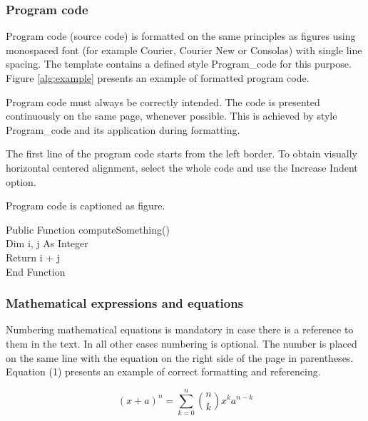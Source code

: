\subsubsection{Program code}


Program code (source code) is formatted on the same principles as
figures using monospaced font (for example Courier, Courier New or
Consolas) with single line spacing. The template contains a defined
style Program\_code for this purpose. Figure \ref{alg:example}
presents an example of formatted program code.

Program code must always be correctly intended. The code is presented
continuously on the same page, whenever possible. This is achieved by
style Program\_code and its application during formatting.

The first line of the program code starts from the left border. To
obtain visually horizontal centered alignment, select the whole code
and use the Increase Indent option.

Program code is captioned as figure.

\begin{algorithm}[!ht]
  Public Function computeSomething() \\
  Dim i, j As Integer\\
  Return i + j\\
  End Function\\
  \label{alg:example}
\end{algorithm}


\subsubsection{Mathematical expressions and equations}

Numbering mathematical equations is mandatory in case there is a reference to them in
the text. In all other cases numbering is optional. The number is placed on the same line
with the equation on the right side of the page in parentheses. Equation (1) presents an
example of correct formatting and referencing.

\begin{equation}
  (x+a)^n = \sum_{k=0}^{n} {n \choose k} x^ka^{n-k}
\end{equation}

